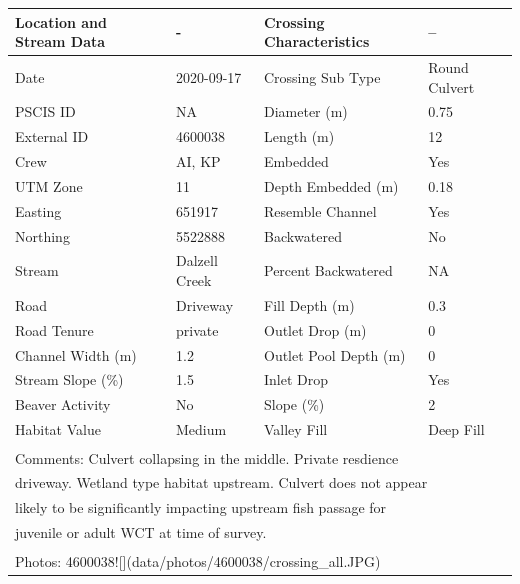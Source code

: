 \documentclass[
]{book}
\begin{document}
\begin{tabular}{llll}
\toprule
Location and Stream Data & - & Crossing Characteristics & --\\
\midrule
Date & 2020-09-17 & Crossing Sub Type & Round Culvert\\
PSCIS ID & NA & Diameter (m) & 0.75\\
External ID & 4600038 & Length (m) & 12\\
Crew & AI, KP & Embedded & Yes\\
UTM Zone & 11 & Depth Embedded (m) & 0.18\\
\addlinespace
Easting & 651917 & Resemble Channel & Yes\\
Northing & 5522888 & Backwatered & No\\
Stream & Dalzell Creek & Percent Backwatered & NA\\
Road & Driveway & Fill Depth (m) & 0.3\\
Road Tenure & private & Outlet Drop (m) & 0\\
\addlinespace
Channel Width (m) & 1.2 & Outlet Pool Depth (m) & 0\\
Stream Slope (\%) & 1.5 & Inlet Drop & Yes\\
Beaver Activity & No & Slope (\%) & 2\\
Habitat Value & Medium & Valley Fill & Deep Fill\\
\bottomrule
\multicolumn{4}{l}{\textsuperscript{} Comments: Culvert collapsing in the middle. Private resdience}\\
\multicolumn{4}{l}{driveway. Wetland type habitat upstream. Culvert does not appear}\\
\multicolumn{4}{l}{likely to be significantly impacting upstream fish passage for}\\
\multicolumn{4}{l}{juvenile or adult WCT at time of survey.}\\
\multicolumn{4}{l}{\textsuperscript{} Photos: 4600038![](data/photos/4600038/crossing\_all.JPG)}\\
\end{tabular}
\end{document}
